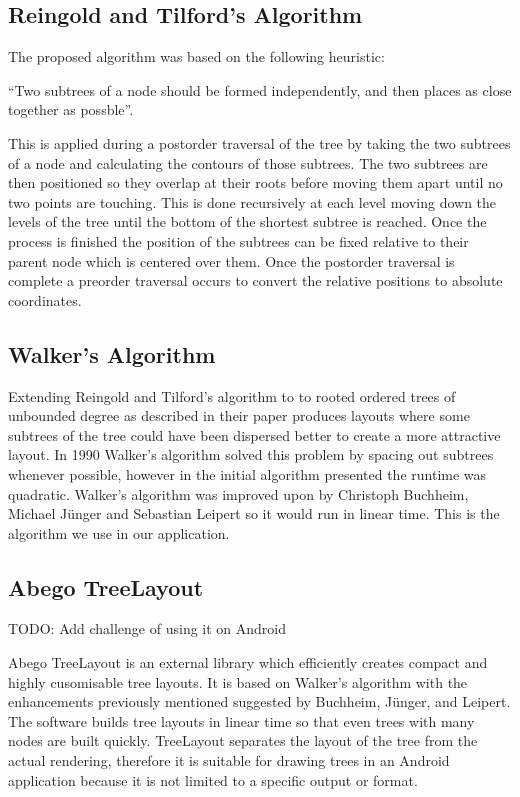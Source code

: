 \documentclass{report}
\begin{document}
\subsection{Reingold and Tilford's Algorithm}

The proposed algorithm was based on the following heuristic: 

``Two subtrees of a node should be formed independently, and then places as close together as possble''\cite{tidierdrawingsws}.

This is applied during a postorder traversal of the tree by taking the two subtrees of a node and calculating the contours of those subtrees. The two subtrees are then positioned so they overlap at their roots before moving them apart until no two points are touching. This is done recursively at each level moving down the levels of the tree until the bottom of the shortest subtree is reached. Once the process is finished the position of the subtrees can be fixed relative to their parent node which is centered over them. Once the postorder traversal is complete a preorder traversal occurs to convert the relative positions to absolute coordinates.

\subsection{Walker's Algorithm}

Extending Reingold and Tilford's algorithm to to rooted ordered trees of unbounded degree as described in their paper produces layouts where some subtrees of the tree could have been dispersed better to create a more attractive layout. In 1990 Walker's algorithm solved this problem by spacing out subtrees whenever possible, however in the initial algorithm presented the runtime was quadratic. Walker's algorithm was improved upon by Christoph Buchheim, Michael J\"unger and Sebastian Leipert so it would run in linear time\cite{improvingwalkers}. This is the algorithm we use in our application. 

\subsection{Abego TreeLayout}
\label{sub:abego_treelayout}

TODO: Add challenge of using it on Android

Abego TreeLayout is an external library which efficiently creates compact and highly cusomisable tree layouts. It is based on Walker's algorithm with the enhancements previously mentioned suggested by Buchheim, J\"unger, and Leipert\cite{treelayoutlineartime}. The software builds tree layouts in linear time so that even trees with many nodes are built quickly. TreeLayout separates the layout of the tree from the actual rendering, therefore it is suitable for drawing trees in an Android application because it is not limited to a specific output or format.
\end{document}

